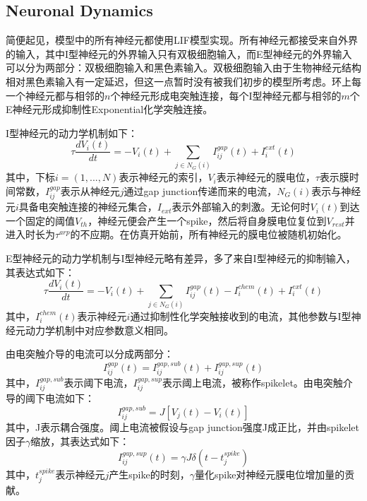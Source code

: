 \documentclass[lang=cn,11pt,a4paper,cite=numbers]{elegantpaper}
\begin{document}
\subsection{Neuronal Dynamics}
  简便起见，模型中的所有神经元都使用LIF模型实现。所有神经元都接受来自外界的输入，其中I型神经元的外界输入只有双极细胞输入，而E型神经元的外界输入可以分为两部分：双极细胞输入和黑色素输入。双极细胞输入由于生物神经元结构相对黑色素输入有一定延迟，但这一点暂时没有被我们初步的模型所考虑。环上每一个神经元都与相邻的$n$个神经元形成电突触连接，每个I型神经元都与相邻的$m$个E神经元形成抑制性Exponential化学突触连接。

  I型神经元的动力学机制如下：
\begin{equation}
    {\tau}\frac{dV_{i}(t)}{dt} = -V_{i}(t) + \sum_{j \in N_{G}(i)}I_{ij}^{gap}(t) + I_{i}^{ext}(t)
\end{equation}
其中，下标$i = (1,...,N)$表示神经元的索引，$V_{i}$表示神经元的膜电位，$\tau$表示膜时间常数，$I_{ij}^{gap}$表示从神经元$j$通过gap junction传递而来的电流，$N_{G}(i)$表示与神经元$i$具备电突触连接的神经元集合，$I_{ext}$表示外部输入的刺激。无论何时$V_{i}(t)$到达一个固定的阈值$V_{th}$，神经元便会产生一个spike，然后将自身膜电位复位到$V_{rest}$并进入时长为$\tau^{arp}$的不应期。在仿真开始前，所有神经元的膜电位被随机初始化。

  E型神经元的动力学机制与I型神经元略有差异，多了来自I型神经元的抑制输入，其表达式如下：
\begin{equation}
    {\tau}\frac{dV_{i}(t)}{dt} = -V_{i}(t) + \sum_{j \in N_{G}(i)}I_{ij}^{gap}(t) - I_{i}^{chem}(t) + I_{i}^{ext}(t)
\end{equation}
其中，$I_{i}^{chem}(t)$表示神经元$i$通过抑制性化学突触接收到的电流，其他参数与I型神经元动力学机制中对应参数意义相同。

  由电突触介导的电流可以分成两部分：
\begin{equation}
    I_{ij}^{gap}(t) = I_{ij}^{gap,sub}(t) + I_{ij}^{gap,sup}(t)
\end{equation}
其中，$I_{ij}^{gap,sub}$表示阈下电流，$I_{ij}^{gap,sup}$表示阈上电流，被称作spikelet。由电突触介导的阈下电流如下：
\begin{equation}
    I_{ij}^{gap,sub} = J\left[V_{j}(t) - V_{i}(t)\right]
\end{equation}
其中，J表示耦合强度。阈上电流被假设与gap junction强度J成正比，并由spikelet因子$\gamma$缩放，其表达式如下：
\begin{equation}
    I_{ij}^{gap,sup}(t) = {\gamma}J\delta(t - t_{j}^{spike})
\end{equation}
其中，$t_{j}^{spike}$表示神经元$j$产生spike的时刻，$\gamma$量化spike对神经元膜电位增加量的贡献。
\end{document}

